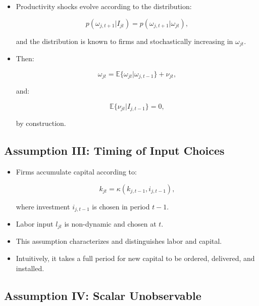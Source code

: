 \documentclass[]{book}
\providecommand{\tightlist}{%
  \setlength{\itemsep}{0pt}\setlength{\parskip}{0pt}}
\begin{document}
\begin{itemize}
\tightlist
\item
  Productivity shocks evolve according to the distribution:

  \begin{equation}
  p(\omega_{j, t + 1}|I_{jt}) = p(\omega_{j, t + 1}|\omega_{jt}), 
  \end{equation}

  and the distribution is known to firms and stochastically increasing
  in \(\omega_{jt}\).
\item
  Then:

  \begin{equation}
  \omega_{jt} = \mathbb{E}\{\omega_{jt}|\omega_{j, t - 1}\} + \nu_{jt},
  \end{equation}

  and:

  \begin{equation}
  \mathbb{E}\{\nu_{jt}|I_{j, t - 1}\} = 0,
  \end{equation}

  by construction.
\end{itemize}

\subsection{Assumption III: Timing of Input
Choices}\label{assumption-iii-timing-of-input-choices}

\begin{itemize}
\tightlist
\item
  Firms accumulate capital according to:

  \begin{equation}
  k_{jt} = \kappa(k_{j, t - 1}, i_{j, t - 1}),
  \end{equation}

  where investment \(i_{j, t - 1}\) is chosen in period \(t - 1\).
\item
  Labor input \(l_{jt}\) is non-dynamic and chosen at \(t\).
\item
  This assumption characterizes and distinguishes labor and capital.
\item
  Intuitively, it takes a full period for new capital to be ordered,
  delivered, and installed.
\end{itemize}

\subsection{Assumption IV: Scalar
Unobservable}\label{assumption-iv-scalar-unobservable}
\end{document}
